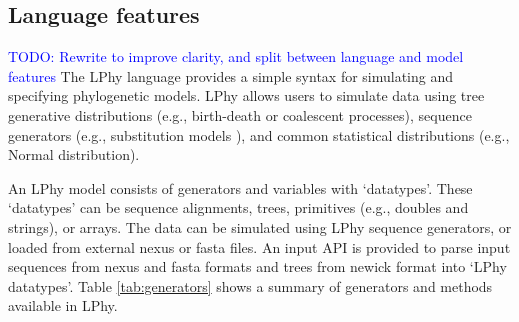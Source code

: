 \documentclass[10pt,letterpaper,table]{article}
\begin{document}
\subsection{Language features}
\textcolor{blue}{TODO: Rewrite to improve clarity, and split between language and model features}
The LPhy language provides a simple syntax for simulating and specifying phylogenetic models.
LPhy allows users to simulate data using tree generative distributions (e.g., birth-death or coalescent processes), sequence generators (e.g., substitution models \cite{gtr}), and common statistical distributions (e.g., Normal distribution). %

An LPhy model consists of generators and variables with `datatypes'. 
These `datatypes' can be sequence alignments, trees, primitives (e.g., doubles and strings), or arrays. 
The data can be simulated using LPhy sequence generators, or loaded from external nexus or fasta files. 
An input API is provided to parse input sequences from nexus and fasta formats and trees from newick format into `LPhy datatypes'. 
Table \ref{tab:generators} shows a summary of generators and methods available in LPhy. 
\end{document}
